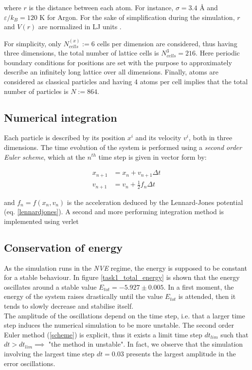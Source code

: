 \documentclass[12pt,english]{smfart}
\begin{document}
where $r$ is the distance between each atom.
For instance, $\sigma = 3.4$ \si{\angstrom} and $\varepsilon/k_B = 120$ \si{K} for Argon.  For the sake of simplification during the simulation, $r$ and $V(r)$ are normalized in \si{LJ} units \cite{ljunits}.

\noindent
For simplicity, only $N_{cells}^{(x)} := 6$ cells per dimension are considered, thus having three dimensions, the total number of lattice cells is $N_{cells}^3 = 216$.
Here periodic boundary conditions for positions are set with the purpose to approximately describe an infinitely long lattice over all dimensions. Finally, atoms are considered as classical particles and having 4 atoms per cell implies that the total number of particles is $N := 864$.

\subsection{Numerical integration}
\noindent Each particle is described by its position $x^i$ and its velocity $v^i$, both in three dimensions. The time evolution of the system is performed using a \textit{second order Euler scheme}, which at the $n^{th}$ time step is given in vector form by:

\begin{align}\label{scheme}
    x_{n+1} &= x_n + v_{n+1} \Delta t  \\
    v_{n+1} &= v_n + \frac{1}{2} f_n \Delta t \nonumber
\end{align}

and $f_n = f(x_n, v_n)$ is the acceleration deduced by the Lennard-Jones potential (eq. \ref{lennardjones}).
A second and more performing integration method is implemented using verlet 

\subsection{Conservation of energy} \label{sec:energy}

As the simulation runs in the \textit{NVE} regime, the energy is supposed to be constant for a stable behaviour. In figure \ref{task1_total_energy} is shown that the energy oscillates around a stable value $E_{tot} = -5.927 \pm 0.005$. In a first moment, the energy of the system raises drastically until the value $E_{tot}$ is attended, then it tends to slowly decrease and stabilise itself.
\\
The amplitude of the oscillations depend on the time step, i.e. that a larger time step induces the numerical simulation to be more unstable. The second order Euler method (\ref{scheme}) is explicit, thus it exists a limit time step $dt_{lim}$ such that $dt > dt_{lim} \implies $ "the method in unstable".
In fact, we observe that the simulation involving the largest time step $dt = 0.03$ presents the largest amplitude in the error oscillations. 
\end{document}
